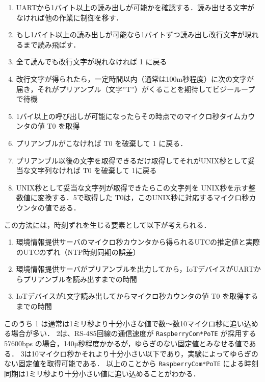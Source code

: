 \begin{enumerate}
\item UARTから1バイト以上の読み出しが可能かを確認する．読み出せる文字がなければ他の作業に制御を移す．
\item もし1バイト以上の読み出しが可能なら1バイトずつ読み出し改行文字が現れるまで読み飛ばす．
\item 全て読んでも改行文字が現れなければ 1 に戻る
\item 改行文字が得られたら，一定時間以内（通常は100m秒程度）に次の文字が届き，それがプリアンブル（文字''T''）がくることを期待してビジーループで待機
\item 1バイ以上の呼び出しが可能になったらその時点でのマイクロ秒タイムカウンタの値 T0 を取得
\item プリアンブルがこなければ T0 を破棄して 1 に戻る．
\item プリアンブル以後の文字を取得できるだけ取得してそれがUNIX秒として妥当な文字列なければ T0 を破棄して 1に戻る
\item UNIX秒として妥当な文字列が取得できたらこの文字列を UNIX秒を示す整数値に変換する．5で取得した T0は，このUNIX秒に対応するマイクロ秒カウンタの値である．
\end{enumerate}

この方法には，時刻ずれを生じる要素として以下が考えられる．

\begin{enumerate}
\item 環境情報提供サーバのマイクロ秒カウンタから得られるUTCの推定値と実際のUTCのずれ（NTP時刻同期の誤差）
\item 環境情報提供サーバがプリアンブルを出力してから，IoTデバイスがUARTからプリアンブルを読み出すまでの時間
\item IoTデバイスが1文字読み出してからマイクロ秒カウンタの値 T0 を取得するまでの時間
\end{enumerate}

このうち 1 は通常は1ミリ秒より十分小さな値で数〜数10マイクロ秒に追い込める場合が多い．
2は、RS-485回線の通信速度が {\tt Raspberry\-Com*PoTE} が採用する 57600bps の場合，140μ秒程度かかるが，ゆらぎのない固定値とみなせる値である．
3は10マイクロ秒かそれより十分小さい以下であり，実験によってゆらぎのない固定値を取得可能である．
以上のことから {\tt Raspberry\-Com*PoTE} による時刻同期は1ミリ秒より十分小さい値に追い込めることがわかる．


